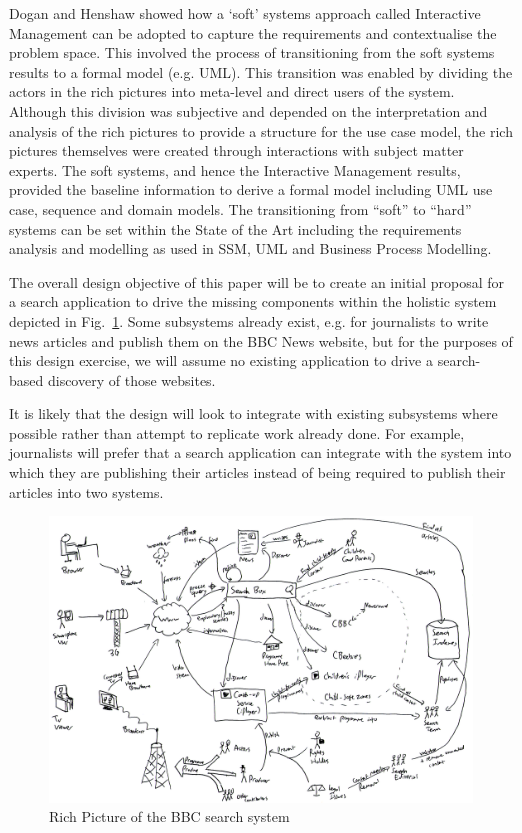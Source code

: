 \documentclass[oribibl]{llncs}
\begin{document}
Dogan and Henshaw\citep{dogan2010conceptual}
showed how a ‘soft’ systems approach called Interactive
Management can be adopted to capture the requirements and contextualise the
problem space. This involved the process of transitioning from the soft systems
results to a formal model (e.g. UML). This transition was enabled by dividing
the actors in the rich pictures into meta-level and direct users of the system.
Although this division was subjective and depended on the interpretation  and
analysis of the rich pictures to provide a structure for the use case model,
the rich pictures themselves were created through interactions with subject
matter experts. The soft systems, and hence the Interactive Management results,
provided the baseline information to derive a formal model including UML use
case, sequence and domain models. The transitioning from ``soft'' to ``hard''
systems can be set within the State of the Art including the requirements
analysis and modelling as used in SSM, UML and Business Process Modelling.

The overall design objective of this paper will be to create an initial
proposal for a
search application to drive the missing components within the holistic
system depicted in Fig.~\ref{rich-picture}. Some subsystems already
exist, e.g. for journalists to write news articles and publish them on the
BBC News website, but for the purposes of this design exercise, we will
assume no existing application to drive a search-based discovery of
those websites.

It is likely that the design will look to integrate with
existing subsystems where possible rather than attempt to replicate
work already done. For example, journalists will prefer that a search
application can integrate with the system into which they are publishing
their articles instead of being required to publish their articles into
two systems.

\begin{figure}
  \begin{center}
    \includegraphics[width=\linewidth]{rich-picture.png}
  \end{center}
  \caption{Rich Picture of the BBC search system\label{rich-picture}}
\end{figure}
\end{document}
